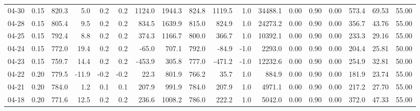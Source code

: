 \begin{threeparttable}
{\begin{tabular}{lrrrrrrrrrrrrrrrrr}
  04-30 &     0.15 & 820.3 &               5.0 &               0.2 &                0.2 &             1124.0 &  1944.3 & 824.8 &     1119.5 &                      1.0 &             34488.1 &       0.00 &      0.90 &           0.00 &            573.4 &           69.53 &                  55.00 \\
  04-28 &     0.15 & 805.4 &               9.5 &               0.2 &                0.2 &              834.5 &  1639.9 & 815.0 &      824.9 &                      1.0 &             24273.2 &       0.00 &      0.90 &           0.00 &            356.7 &           43.76 &                  55.00 \\
  04-25 &     0.15 & 792.4 &               8.8 &               0.2 &                0.2 &              374.3 &  1166.7 & 800.0 &      366.7 &                      1.0 &             10392.1 &       0.00 &      0.90 &           0.00 &            233.3 &           29.16 &                  55.00 \\
  04-24 &     0.15 & 772.0 &              19.4 &               0.2 &                0.2 &              -65.0 &   707.1 & 792.0 &      -84.9 &                     -1.0 &              2293.0 &       0.00 &      0.90 &           0.00 &            204.4 &           25.81 &                  50.00 \\
  04-23 &     0.15 & 759.7 &              14.4 &               0.2 &                0.2 &             -453.9 &   305.8 & 777.0 &     -471.2 &                     -1.0 &             12232.6 &       0.00 &      0.90 &           0.00 &            254.9 &           32.81 &                  50.00 \\
  04-22 &     0.20 & 779.5 &             -11.9 &              -0.2 &               -0.2 &               22.3 &   801.9 & 766.2 &       35.7 &                      1.0 &               884.9 &       0.00 &      0.90 &           0.00 &            181.9 &           23.74 &                  55.00 \\
  04-21 &     0.20 & 784.0 &               1.2 &               0.1 &                0.1 &              207.9 &   991.9 & 784.0 &      207.9 &                      1.0 &              4971.1 &       0.00 &      0.90 &           0.00 &            217.2 &           27.70 &                  55.00 \\
  04-18 &     0.20 & 771.6 &              12.5 &               0.2 &                0.2 &              236.6 &  1008.2 & 786.0 &      222.2 &                      1.0 &              5042.0 &       0.00 &      0.90 &           0.00 &            372.0 &           47.33 &                  55.00 \\

\end{tabular}}
\end{threeparttable}
